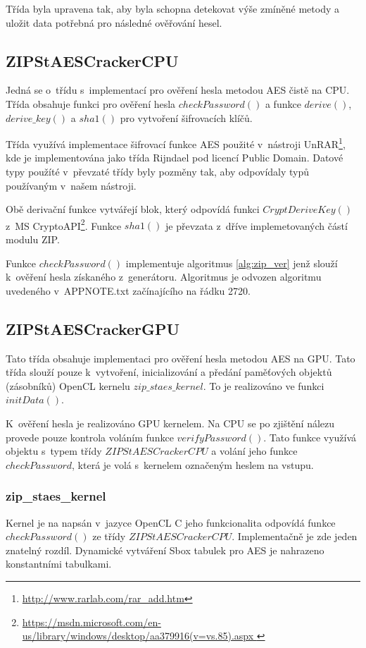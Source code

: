  Třída byla upravena tak, aby byla schopna detekovat výše zmíněné metody a uložit data potřebná pro
následné ověřování hesel.

\subsection{ZIPStAESCrackerCPU}
Jedná se o~třídu s~implementací pro ověření hesla metodou AES čistě na CPU. Třída obsahuje funkci
pro ověření hesla $checkPassword()$ a funkce $derive()$, $derive\_key()$ a $sha1()$ pro vytvoření
šifrovacích klíčů.

Třída využívá implementace šifrovací funkce AES použité v~nástroji
UnRAR\footnote{\url{http://www.rarlab.com/rar\_add.htm}}, kde je implementována jako třída Rijndael
pod licencí Public Domain. Datové typy použíté v~převzaté třídy byly pozměny tak, aby odpovídaly
typů používaným v~našem nástroji.

Obě derivační funkce vytvářejí blok, který odpovídá funkci $CryptDeriveKey()$ z~MS
CryptoAPI\footnote{\url{https://msdn.microsoft.com/en-us/library/windows/desktop/aa379916(v=vs.85).aspx
}}. Funkce $sha1()$ je převzata z~dříve implemetovaných částí modulu ZIP.

 Funkce $checkPassword()$ implementuje algoritmus \ref{alg:zip_ver} jenž slouží k~ověření hesla
získaného z~generátoru. Algoritmus je odvozen algoritmu uvedeného v~APPNOTE.txt začínajícího na
řádku 2720.

\subsection{ZIPStAESCrackerGPU}
Tato třída obsahuje implementaci pro ověření hesla metodou AES na GPU. Tato třída slouží pouze
k~vytvoření, inicializování a předání paměťových objektů (zásobníků) OpenCL kernelu
$zip\_staes\_kernel$. To je realizováno ve funkci $initData()$. 

 K~ověření hesla je realizováno GPU kernelem. Na CPU se po zjištění nálezu provede pouze
kontrola voláním funkce $verifyPassword()$. Tato funkce využívá objektu s~typem třídy
$ZIPStAESCrackerCPU$ a volání jeho funkce $checkPassword$, která je volá s~kernelem označeným
heslem na vstupu.

\subsubsection{zip\_staes\_kernel}
Kernel je na napsán v~jazyce OpenCL C jeho funkcionalita odpovídá funkce $checkPassword()$ ze
třídy $ZIPStAESCrackerCPU$. Implementačně je zde jeden znatelný rozdíl. Dynamické vytváření Sbox
tabulek pro AES je nahrazeno konstantními tabulkami.
 
